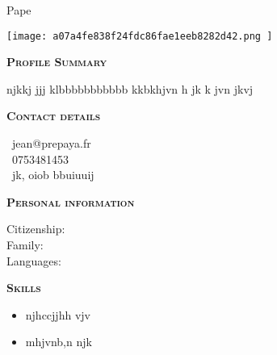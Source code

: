 \documentclass[11pt,a4paper]{article}
\newcommand{\headleft}[1]{\vspace*{3ex}\textsc{\textbf{#1}}\par%
    \vspace*{-1.5ex}\hrulefill\par\vspace*{0.7ex}}
\begin{document}
\setlength{\topskip}{0pt}\setlength{\parindent}{0pt}\setlength{\parskip}{0pt}
\setlength{\fboxsep}{0pt}\pagestyle{empty}\raggedbottom

\begin{minipage}[t]{0.33\textwidth}
\colorbox{cvblue}{\begin{minipage}[t][5mm][t]{\textwidth}\null\hfill\null\end{minipage}}
\vspace{-.2ex}
\colorbox{cvblue!90}{\color{white}
\textwidth
\begin{minipage}[t][293mm][t]{0.82\textwidth}\raggedright
\vspace*{2.5ex}

\Large Pape \textbf{\textscFALL} \normalsize


\null\hfill\texttt{[image:  a07a4fe838f24fdc86fae1eeb8282d42.png ]}\hfill\null


\vspace*{0.5ex}

\headleft{Profile Summary}
njkkj jjj klbbbbbbbbbbb kkbkhjvn h jk k jvn jkvj

\headleft{Contact details}\small
\MVAt\ {\small jean@prepaya.fr} \\[0.4ex]
\Mobilefone\ 0753481453 \\[0.5ex]
\Letter\ jk, oiob bbuiuuij
\normalsize

\headleft{Personal information}
Citizenship: \textbfsenegalaise \\[0.5ex]
Family:  \\[0.5ex]
Languages: 

\headleft{Skills}
\begin{itemize}

  \item njhccjjhh vjv

  \item mhjvnb,n njk

\end{itemize}

\end{minipage}\textwidth
}
\end{minipage}
\end{document}
